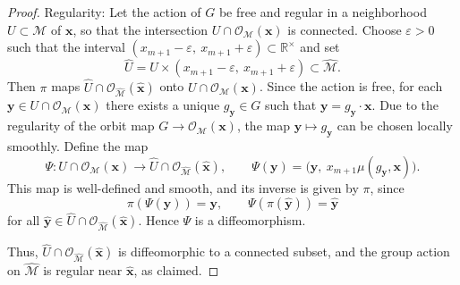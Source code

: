 \documentclass[10pt,a4paper]{amsart}
\begin{document}
\begin{proof}
\medskip

Regularity: Let the action of $G$ be free and regular in a neighborhood $U \subset \mathcal M$ of $\boldsymbol x$, so that the intersection $U \cap \mathcal O_{\mathcal M}(\boldsymbol x)$ is connected.
Choose $\varepsilon > 0$ such that the interval $(x_{m+1} - \varepsilon,\ x_{m+1} + \varepsilon) \subset \mathbb{R}^\times$ and set
\[
\widehat U = U \times (x_{m+1} - \varepsilon,\ x_{m+1} + \varepsilon) \subset \widehat{\mathcal M}.
\]
Then $\pi$ maps $\widehat U \cap \mathcal O_{\widehat{\mathcal M}}(\boldsymbol{\hat x})$ onto $U \cap \mathcal O_{\mathcal M}(\boldsymbol x)$.
Since the action is free, for each $\boldsymbol y \in U \cap \mathcal O_{\mathcal M}(\boldsymbol x)$ there exists a unique $g_{\boldsymbol y} \in G$ such that $\boldsymbol y = g_{\boldsymbol y} \cdot \boldsymbol x$. Due to the regularity of the orbit map $G \to \mathcal O_{\mathcal M}(\boldsymbol x)$, the map $\boldsymbol y \mapsto g_{\boldsymbol y}$ can be chosen locally smoothly. Define the map
\[
\Psi : U \cap \mathcal O_{\mathcal M}(\boldsymbol x) \longrightarrow \widehat U \cap \mathcal O_{\widehat{\mathcal M}}(\boldsymbol{\hat x}), \qquad
\Psi(\boldsymbol y) = \bigl(\boldsymbol y,\ x_{m+1} \mu(g_{\boldsymbol y}, \boldsymbol x)\bigr).
\]
This map is well-defined and smooth, and its inverse is given by $\pi$, since
\[
\pi(\Psi(\boldsymbol y)) = \boldsymbol y, \qquad \Psi(\pi(\boldsymbol{\hat y})) = \boldsymbol{\hat y}
\]
for all $\boldsymbol{\hat y} \in \widehat U \cap \mathcal O_{\widehat{\mathcal M}}(\boldsymbol{\hat x})$.
Hence $\Psi$ is a diffeomorphism.

Thus, $\widehat U \cap \mathcal O_{\widehat{\mathcal M}}(\boldsymbol{\hat x})$ is diffeomorphic to a connected subset, and the group action on $\widehat{\mathcal M}$ is regular near $\boldsymbol{\hat x}$, as claimed.
\end{proof}
\end{document}
